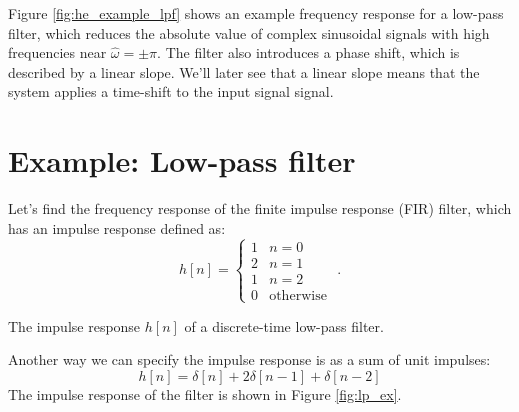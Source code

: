 Figure \ref{fig:he_example_lpf} shows an example frequency response
for a low-pass filter, which reduces the absolute value of complex
sinusoidal signals with high frequencies near
$\hat{\omega}=\pm \pi$. The filter also introduces a phase shift,
which is described by a linear slope. We'll later see that a linear
slope means that the system applies a time-shift to the input signal
signal.

\section{Example: Low-pass filter}

Let's find the frequency response of the finite impulse response (FIR)
filter, which has an impulse response defined as:
\begin{equation}
h[n] = \left\{\begin{array}{cc}
1 & n=0\\
2 & n=1\\
1 & n=2\\
0 & \mathrm{otherwise}
\end{array} \,\,.
\right.
\end{equation}
\begin{marginfigure}
\begin{center}
\end{center}
\caption{The impulse response $h[n]$ of a discrete-time low-pass filter.}
\label{fig:lp_ex}
\end{marginfigure}
\noindent Another way we can specify the impulse response is as a sum of unit impulses:
\begin{equation}
h[n] = \delta[n] + 2\delta[n-1] + \delta[n-2]
\end{equation}
The impulse response of the filter is shown in Figure \ref{fig:lp_ex}.

